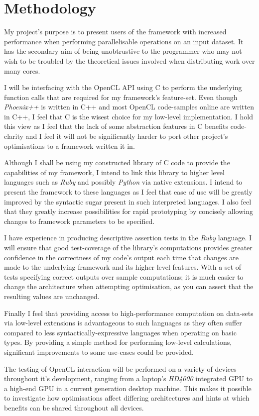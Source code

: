 \section{Methodology}
My project's purpose is to present users of the framework with increased performance when performing parallelisable operations on an input dataset.
It has the secondary aim of being unobtrustive to the programmer who may not wish to be troubled by the theoretical issues involved when distributing work over many cores.

I will be interfacing with the OpenCL API using C to perform the underlying function calls that are required for my framework's feature-set.
Even though \emph{Phoenix++} is written in C++ and most OpenCL code-samples online are written in C++, I feel that C is the wisest choice for my low-level implementation. I hold this view as I feel that the lack of some abstraction features in C benefits code-clarity and I feel it will not be significantly harder to port other project's optimisations to a framework written it in.

Although I shall be using my constructed library of C code to provide the capabilities of my framework, I intend to link this library to higher level languages such as \emph{Ruby} and possibly \emph{Python} via native extensions. I intend to present the framework to these languages as I feel that ease of use will be greatly improved by the syntactic sugar present in such interpreted languages. I also feel that they greatly increase possibilities for rapid prototyping by concisely allowing changes to framework parameters to be specified.

I have experience in producing descriptive assertion tests in the \emph{Ruby} language. I will ensure that good test-coverage of the library's computations provides greater confidence in the correctness of my code's output each time that changes are made to the underlying framework and its higher level features. With a set of tests specifying correct outputs over sample computations; it is much easier to change the architecture when attempting optimisation, as you can assert that the resulting values are unchanged.

Finally I feel that providing access to high-performance computation on data-sets via low-level extensions is advantageous to such languages as they often suffer compared to less syntactically-expressive languages when operating on basic types. By providing a simple method for performing low-level calculations, significant improvements to some use-cases could be provided.

The testing of OpenCL interaction will be performed on a variety of devices throughout it's development, ranging from a laptop's \emph{HD4000} integrated GPU to a high-end GPU in a current generation desktop machine. This makes it possible to investigate how optimisations affect differing architectures and hints at which benefits can be shared throughout all devices.
